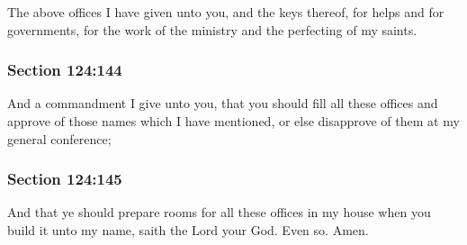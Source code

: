 		The above offices I have given unto you, and the keys thereof, for helps and for governments, for the work of the ministry and the perfecting of my saints.


	\subsubsection{Section 124:144} %
		\label{DC124-144}

		And a commandment I give unto you, that you should fill all these offices and approve of those names which I have mentioned, or else disapprove of them at my general conference;


	\subsubsection{Section 124:145} %
		\label{DC124-145}

		And that ye should prepare rooms for all these offices in my house when you build it unto my name, saith the Lord your God.  Even so.  Amen.

